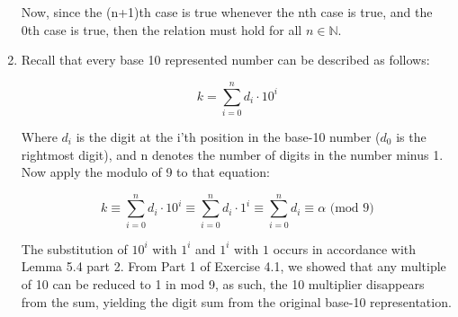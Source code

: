 \begin{enumerate}
Now, since the (n+1)th case is true whenever the nth case is true, and the 0th case is true, then the relation must hold for all $n \in \mathbb{N}$.

\item
Recall that every base 10 represented number can be described as follows:

\begin{equation}
    k = \sum_{i=0}^{n} d_{i} \cdot 10^{i}
\end{equation}

Where $d_{i}$ is the digit at the i'th position in the base-10 number ($d_{0}$ is the rightmost digit), and n denotes the number of digits in the number minus 1. Now apply the modulo of 9 to that equation:

\begin{equation}
    k \equiv \sum_{i=0}^{n} d_{i} \cdot 10^{i} \equiv \sum_{i=0}^{n} d_{i} \cdot 1^{i} \equiv \sum_{i=0}^{n} d_{i} \equiv \alpha \text{ (mod 9)}
\end{equation}

The substitution of $10^{i}$ with $1^{i}$ and $1^{i}$ with $1$ occurs in accordance with Lemma 5.4 part 2. From Part 1 of Exercise 4.1, we showed that any multiple of 10 can be reduced to 1 in mod 9, as such, the 10 multiplier disappears from the sum, yielding the digit sum from the original base-10 representation.

\end{enumerate}